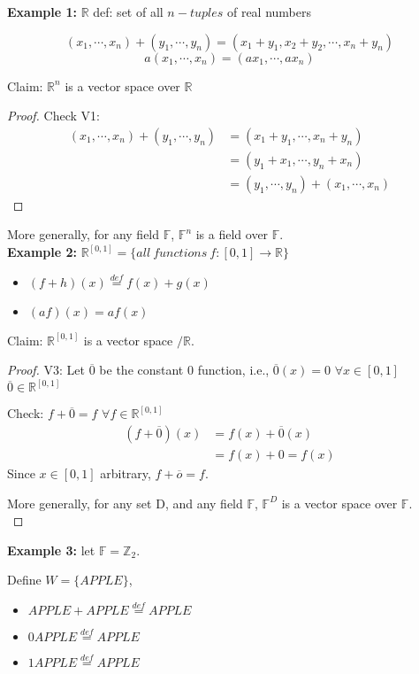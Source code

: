 \documentclass[12pt]{article}
\theoremstyle{plain}
\begin{document}
	\newpage
	{\color{Brown}
	\textbf{Example 1:}
		$\mathbb{R}$ def: set of all $n-tuples$ of real numbers
		
		\[
			(x_1,\cdots, x_n)+(y_1, \cdots, y_n)=
			(x_1+y_1,x_2+y_2,\cdots,x_n+y_n)
		\]
		\[
			a(x_1,\cdots, x_n) = (ax_1,\cdots, ax_n)
		\]

		Claim: $\mathbb{R}^n$ is a vector space over $\mathbb{R}$
	\begin{proof}
		Check V1: 
		\begin{align*}
			(x_1, \cdots, x_n)+(y_1,\cdots, y_n) 
			&= (x_1+y_1,\cdots, x_n+y_n)\\
			&= (y_1+x_1,\cdots, y_n+x_n)\\
			&= (y_1,\cdots, y_n) + (x_1, \cdots, x_n)	
		\end{align*}
	\end{proof}

	More generally, for any field $\mathbb{F}$, $\mathbb{F}^n$ is a field over
	$\mathbb{F}$.\\

	\textbf{Example 2:}
	$\mathbb{R}^{[0,1]} =\{all\ functions \ f:[0,1] \to \mathbb{R}\}$
	\begin{itemize}
		\item $(f+h)(x) \overset{def}{=} f(x)+g(x)$
		\item $(af)(x) = af(x)$ 
	\end{itemize}

	Claim: $\mathbb{R}^[0,1]$ is a vector space $/ \mathbb{R}$.
	\begin{proof}
		V3: Let $\overline{0}$ be the constant 0 function, 
		i.e., $\overline{0}(x) = 0$ $\forall x\in [0,1]$
		$\overline{0} \in \mathbb{R} ^{[0,1]}$

		Check: $f+\overline{0} = f$ $\forall f \in \mathbb{R}^{[0,1]}$
		\begin{align*}
			(f+\overline{0})(x) &= f(x) +\overline{0}(x) \\
			&= f(x) + 0 = f(x)
		\end{align*}
		Since $x\in [0,1] $ arbitrary, $f+\overline{o}=f$. 

		More generally, for any set D, and any field $\mathbb{F}$, 
		$\mathbb{F}^D$ is a vector space over $\mathbb{F}$.\\
	\end{proof}

	\textbf{Example 3: }
	let $\mathbb{F} = \mathbb{Z}_2$. 

	Define $W=\{APPLE\}$, 
	\begin{itemize}
		\item $APPLE + APPLE \overset{def}{=} APPLE$
		\item $0APPLE \overset{def}{=} APPLE$
		\item $1APPLE \overset{def}{=} APPLE$
	\end{itemize}

}
\end{document}
